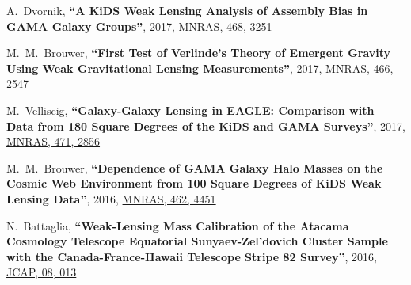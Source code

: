 \documentclass{article}
\def\myself{\textbf{\color{red} C.~Sif\'on}}
\def\jcap{JCAP}
\def\mnras{MNRAS}
\newcommand{\paper}[1]{\textbf{``#1''}}
\begin{document}
\begin{etaremune}
\item
A.~Dvornik, 
\paper{A KiDS Weak Lensing Analysis of Assembly Bias in GAMA Galaxy Groups},
2017, \href{http://adsabs.harvard.edu/abs/2017MNRAS.468.3251D}{\mnras, 468, 3251}

\item
M.~M.~Brouwer, 
\paper{First Test of Verlinde's Theory of Emergent Gravity Using Weak 
Gravitational Lensing Measurements},
2017, \href{http://adsabs.harvard.edu/abs/2017MNRAS.466.2547B}{\mnras, 466, 2547}

\item
M.~Velliscig, 
\paper{Galaxy-Galaxy Lensing in EAGLE: Comparison with Data from 180 Square
Degrees of the KiDS and GAMA Surveys},
2017, \href{http://adsabs.harvard.edu/abs/2017MNRAS.471.2856V}{\mnras, 471, 2856}

\item
M.~M.~Brouwer, 
\paper{Dependence of GAMA Galaxy Halo Masses on the Cosmic Web Environment from 
100 Square Degrees of KiDS Weak Lensing Data},
2016, \href{http://adsabs.harvard.edu/abs/2016MNRAS.462.4451B}{\mnras, 462, 4451}

\item
N.~Battaglia, 
\paper{Weak-Lensing Mass Calibration of the Atacama Cosmology Telescope Equatorial 
Sunyaev-Zel'dovich Cluster Sample with the Canada-France-Hawaii Telescope Stripe 82 Survey},
2016, \href{http://adsabs.harvard.edu/abs/2016JCAP...08..013B}{\jcap, 08, 013}


\end{etaremune}
\end{document}
